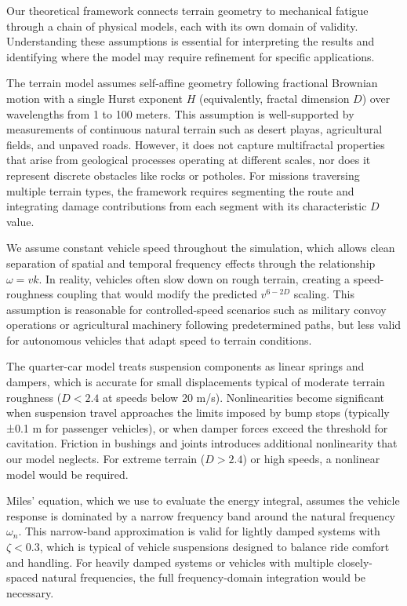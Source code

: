 \documentclass[11pt]{article}
\begin{document}
Our theoretical framework connects terrain geometry to mechanical fatigue through a chain of physical models, each with its own domain of validity. Understanding these assumptions is essential for interpreting the results and identifying where the model may require refinement for specific applications.

The terrain model assumes self-affine geometry following fractional Brownian motion with a single Hurst exponent $H$ (equivalently, fractal dimension $D$) over wavelengths from 1 to 100 meters. This assumption is well-supported by measurements of continuous natural terrain such as desert playas, agricultural fields, and unpaved roads. However, it does not capture multifractal properties that arise from geological processes operating at different scales, nor does it represent discrete obstacles like rocks or potholes. For missions traversing multiple terrain types, the framework requires segmenting the route and integrating damage contributions from each segment with its characteristic $D$ value.

We assume constant vehicle speed throughout the simulation, which allows clean separation of spatial and temporal frequency effects through the relationship $\omega = vk$. In reality, vehicles often slow down on rough terrain, creating a speed-roughness coupling that would modify the predicted $v^{6-2D}$ scaling. This assumption is reasonable for controlled-speed scenarios such as military convoy operations or agricultural machinery following predetermined paths, but less valid for autonomous vehicles that adapt speed to terrain conditions.

The quarter-car model treats suspension components as linear springs and dampers, which is accurate for small displacements typical of moderate terrain roughness ($D < 2.4$ at speeds below 20 m/s). Nonlinearities become significant when suspension travel approaches the limits imposed by bump stops (typically ±0.1 m for passenger vehicles), or when damper forces exceed the threshold for cavitation. Friction in bushings and joints introduces additional nonlinearity that our model neglects. For extreme terrain ($D > 2.4$) or high speeds, a nonlinear model would be required.

Miles' equation, which we use to evaluate the energy integral, assumes the vehicle response is dominated by a narrow frequency band around the natural frequency $\omega_n$. This narrow-band approximation is valid for lightly damped systems with $\zeta < 0.3$, which is typical of vehicle suspensions designed to balance ride comfort and handling. For heavily damped systems or vehicles with multiple closely-spaced natural frequencies, the full frequency-domain integration would be necessary.
\end{document}

